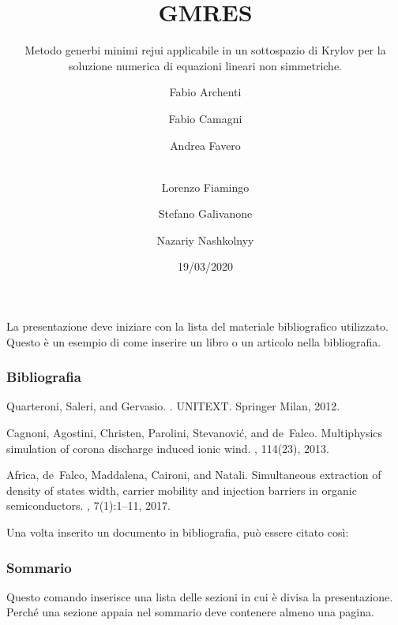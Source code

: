 \documentclass[10pt]{beamer}
\begin{document}
\begin{frame}
  \title{GMRES}
  \subtitle{Metodo generbi minimi rejui applicabile in un sottospazio di Krylov per la soluzione numerica di equazioni lineari non simmetriche.}
  \date{19/03/2020}
  \author[Principal]{Fabio Archenti \and Fabio Camagni \and Andrea Favero \and  \\Lorenzo Fiamingo \and Stefano Galivanone \and Nazariy Nashkolnyy}
  \maketitle
\end{frame}


\begin{frame}

La presentazione deve iniziare con la lista del materiale
bibliografico utilizzato. Questo è un esempio di come inserire 
un libro o un articolo nella bibliografia.
  \frametitle{Bibliografia}
  \begin{thebibliography}{99}\small
    
    Quarteroni, Saleri, and Gervasio.
    .
    \newblock UNITEXT. Springer Milan, 2012.

    Cagnoni, Agostini, Christen, Parolini, Stevanovi{\'c}, and de~Falco.
    \newblock Multiphysics simulation of corona discharge induced ionic wind.
    , 114(23), 2013.

   Africa, de~Falco, Maddalena, Caironi, and Natali.
   \newblock Simultaneous extraction of density of states width, carrier mobility
   and injection barriers in organic semiconductors.
   , 7(1):1--11, 2017.

   \end{thebibliography}

Una volta inserito un documento in bibliografia, 
può essere citato così:~\cite{quarteroni2012calcolo}
  
\end{frame}  

\begin{frame}
  \frametitle{Sommario}
  Questo comando inserisce una lista delle sezioni in
  cui è divisa la presentazione. Perché una sezione appaia 
  nel sommario deve contenere almeno una pagina.
  \tableofcontents
\end{frame}
\end{document}
